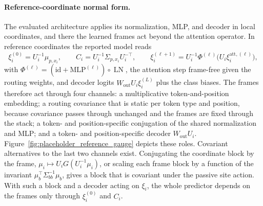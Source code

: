 \documentclass[twoside,11pt]{article}
\begin{document}
\paragraph{Reference-coordinate normal form.}
The evaluated architecture applies its normalization, MLP, and decoder in local coordinates, and there the learned frames act beyond the attention operator. In reference coordinates the reported model reads
\begin{equation}
\xi_i^{(0)}=U_i^{-1}\mu_{p,x_i},\qquad
C_i=U_i^{-1}\Sigma_{p,x_i}U_i^{-\top},\qquad
\xi_i^{(\ell+1)}=U_i^{-1}\Phi^{(\ell)}\bigl(U_i\xi_i^{\mathrm{att},(\ell)}\bigr),
\label{eq:reference_normal_form}
\end{equation}
with $\Phi^{(\ell)}=(\mathrm{id}+\mathrm{MLP}^{(\ell)})\circ\operatorname{LN}$, the attention step frame-free given the routing weights, and decoder logits $W_{\mathrm{out}}U_i\xi_i^{(L)}$ plus the class biases. The frames therefore act through four channels: a multiplicative token-and-position embedding; a routing covariance that is static per token type and position, because covariance passes through unchanged and the frames are fixed through the stack; a token- and position-specific conjugation of the shared normalization and MLP; and a token- and position-specific decoder $W_{\mathrm{out}}U_i$. Figure~\ref{fig:placeholder_reference_gauge} depicts these roles. Covariant alternatives to the last two channels exist. Conjugating the coordinate block by the frame, $\mu_i\mapsto U_iG(U_i^{-1}\mu_i)$, or scaling each frame block by a function of the invariant $\mu_b^\top\Sigma_{bb}^{-1}\mu_b$, gives a block that is covariant under the passive site action. With such a block and a decoder acting on $\xi_i$, the whole predictor depends on the frames only through $\xi_i^{(0)}$ and $C_i$.
\end{document}
